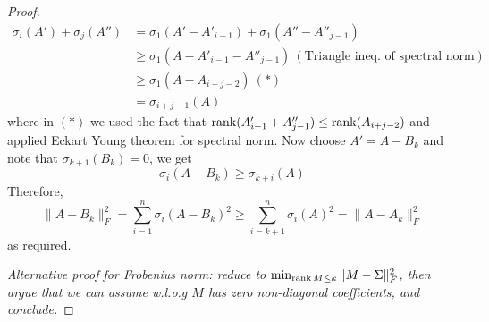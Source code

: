 \documentclass[../book-template.tex]{subfiles}
\begin{document}
\begin{proof}
\begin{align*}
    \sigma_i(A')+\sigma_j(A'') &= \sigma_1(A'-A'_{i-1})+\sigma_1(A''-A''_{j-1})\\
    &\geq \sigma_1(A-A'_{i-1}-A''_{j-1})\ (\text{Triangle ineq. of spectral norm})\\
    &\geq \sigma_1(A-A_{i+j-2})\ (*)\\
    &=\sigma_{i+j-1}(A)
\end{align*}
where in $(*)$ we used the fact that $\operatorname{rank}(A'_{i-1}+A''_{j-1})\leq \operatorname{rank}(A_{i+j-2})$ and applied Eckart Young theorem for spectral norm. Now choose $A'=A-B_k$ and note that $\sigma_{k+1}(B_k)=0$, we get
\begin{equation*}
    \sigma_i(A-B_k)\geq \sigma_{k+i}(A)
\end{equation*}
Therefore,
\begin{equation*}
    \|A-B_k\|_F^2 = \sum_{i=1}^{n}\sigma_i(A-B_k)^2\geq \sum_{i=k+1}^{n}\sigma_i(A)^2 = \|A-A_k\|_F^2
\end{equation*}
as required.

\textit{
Alternative proof for Frobenius norm: reduce to $\min_{\operatorname{rank} M \leq k} \|M-\Sigma\|_F^2$, then argue that we can assume w.l.o.g $M$ has zero non-diagonal coefficients, and conclude.
}

\end{proof}
\end{document}
